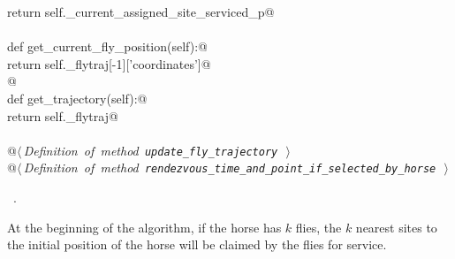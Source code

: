 \documentclass[11.5pt]{report}
\begin{document}
\begin{flushleft}
\begin{list}{}{}
\mbox{}\verb@         return self._current_assigned_site_serviced_p@\\
\mbox{}\verb@@\\
\mbox{}\verb@    def get_current_fly_position(self):@\\
\mbox{}\verb@         return self._flytraj[-1]['coordinates']@\\
\mbox{}\verb@   @\\
\mbox{}\verb@    def get_trajectory(self):@\\
\mbox{}\verb@         return self._flytraj@\\
\mbox{}\verb@@\\
\mbox{}\verb@    @\hbox{$\langle\,${\itshape Definition of method \verb|update_fly_trajectory|}\nobreak\ {\footnotesize {}}$\,\rangle$}\verb@@\\
\mbox{}\verb@    @\hbox{$\langle\,${\itshape Definition of method \verb|rendezvous_time_and_point_if_selected_by_horse|}\nobreak\ {\footnotesize {}}$\,\rangle$}\verb@@\\
\mbox{}\verb@@{\NWsep}
\end{list}
\vspace{-1.5ex}
\footnotesize
\begin{list}{}{\setlength{\itemsep}{-\parsep}\setlength{\itemindent}{-\leftmargin}}
\item \NWtxtMacroRefIn\ .

\item{}
\end{list}
\vspace{4ex}
\end{flushleft}



\vspace{-0.8cm} \newchunk At the beginning of the algorithm, if the horse has $k$ flies, 
the $k$ nearest sites to the initial position of the horse will be claimed by the flies 
for service. 
\end{document}
